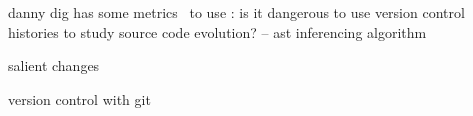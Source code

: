 \documentclass[conference]{IEEEtran}
\begin{document}
danny dig has some metrics~\cite{Negara2012} to use : is it dangerous to use version control histories to study source code evolution? -- ast inferencing algorithm

salient changes

version control with git~\cite{Loeliger2012}

%
%





 
\end{document}
